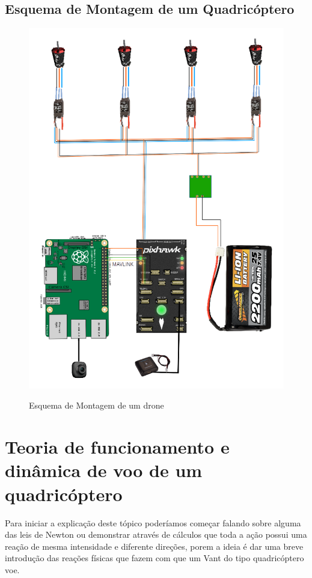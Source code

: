\subsection{Esquema de Montagem de um Quadricóptero}
\begin{figure}[H]
  \centering
  \caption{Esquema de Montagem de um drone}
  \includegraphics[scale=.5]{figs/esquema de ligacao do prototipo.png}
  \label{fig:mount}
\end{figure}
\section{Teoria de funcionamento e dinâmica de voo de um quadricóptero}

Para iniciar a explicação deste tópico poderíamos começar falando sobre alguma das leis de Newton ou demonstrar através de cálculos que toda a ação possui uma reação de mesma intensidade e diferente direções, porem a ideia é dar uma breve introdução das reações físicas que fazem com que um Vant do tipo quadricóptero voe. 

